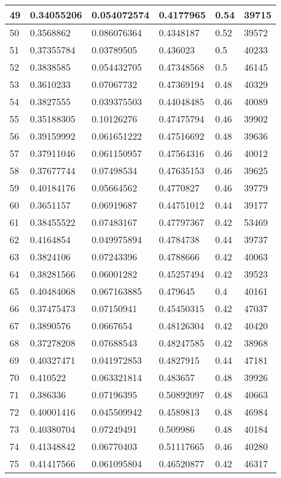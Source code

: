 \begin{longtable}{|l|l|l|l|l|l|}
49 & 0.34055206 & 0.054072574 & 0.4177965 & 0.54 & 39715 \\ \hline 
50 & 0.3568862 & 0.086076364 & 0.4348187 & 0.52 & 39572 \\ \hline 
51 & 0.37355784 & 0.03789505 & 0.436023 & 0.5 & 40233 \\ \hline 
52 & 0.3838585 & 0.054432705 & 0.47348568 & 0.5 & 46145 \\ \hline 
53 & 0.3610233 & 0.07067732 & 0.47369194 & 0.48 & 40329 \\ \hline 
54 & 0.3827555 & 0.039375503 & 0.44048485 & 0.46 & 40089 \\ \hline 
55 & 0.35188305 & 0.10126276 & 0.47475794 & 0.46 & 39902 \\ \hline 
56 & 0.39159992 & 0.061651222 & 0.47516692 & 0.48 & 39636 \\ \hline 
57 & 0.37911046 & 0.061150957 & 0.47564316 & 0.46 & 40012 \\ \hline 
58 & 0.37677744 & 0.07498534 & 0.47635153 & 0.46 & 39625 \\ \hline 
59 & 0.40184176 & 0.05664562 & 0.4770827 & 0.46 & 39779 \\ \hline 
60 & 0.3651157 & 0.06919687 & 0.44751012 & 0.44 & 39177 \\ \hline 
61 & 0.38455522 & 0.07483167 & 0.47797367 & 0.42 & 53469 \\ \hline 
62 & 0.4164854 & 0.049975894 & 0.4784738 & 0.44 & 39737 \\ \hline 
63 & 0.3824106 & 0.07243396 & 0.4788666 & 0.42 & 40063 \\ \hline 
64 & 0.38281566 & 0.06001282 & 0.45257494 & 0.42 & 39523 \\ \hline 
65 & 0.40484068 & 0.067163885 & 0.479645 & 0.4 & 40161 \\ \hline 
66 & 0.37475473 & 0.07150941 & 0.45450315 & 0.42 & 47037 \\ \hline 
67 & 0.3890576 & 0.0667654 & 0.48126304 & 0.42 & 40420 \\ \hline 
68 & 0.37278208 & 0.07688543 & 0.48247585 & 0.42 & 38968 \\ \hline 
69 & 0.40327471 & 0.041972853 & 0.4827915 & 0.44 & 47181 \\ \hline 
70 & 0.410522 & 0.063321814 & 0.483657 & 0.48 & 39926 \\ \hline 
71 & 0.386336 & 0.07196395 & 0.50892097 & 0.48 & 40663 \\ \hline 
72 & 0.40001416 & 0.045509942 & 0.4589813 & 0.48 & 46984 \\ \hline 
73 & 0.40380704 & 0.07249491 & 0.509986 & 0.48 & 40184 \\ \hline 
74 & 0.41348842 & 0.06770403 & 0.51117665 & 0.46 & 40280 \\ \hline 
75 & 0.41417566 & 0.061095804 & 0.46520877 & 0.42 & 46317 \\ \hline 
\end{longtable}